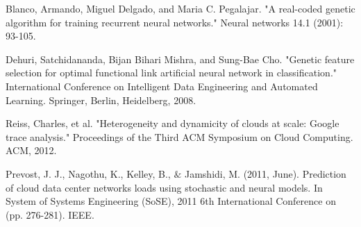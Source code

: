 \documentclass[conference]{IEEEtran}
\begin{document}
\begin{thebibliography}{00}
Blanco, Armando, Miguel Delgado, and Maria C. Pegalajar. "A real-coded genetic algorithm for training recurrent neural networks." Neural networks 14.1 (2001): 93-105.

Dehuri, Satchidananda, Bijan Bihari Mishra, and Sung-Bae Cho. "Genetic feature selection for optimal functional link artificial neural network in classification." International Conference on Intelligent Data Engineering and Automated Learning. Springer, Berlin, Heidelberg, 2008.

Reiss, Charles, et al. "Heterogeneity and dynamicity of clouds at scale: Google trace analysis." Proceedings of the Third ACM Symposium on Cloud Computing. ACM, 2012.

Prevost, J. J., Nagothu, K., Kelley, B., $\&$ Jamshidi, M. (2011, June). Prediction of cloud data center networks loads using stochastic and neural models. In System of Systems Engineering (SoSE), 2011 6th International Conference on (pp. 276-281). IEEE.

\end{thebibliography}
\end{document}
